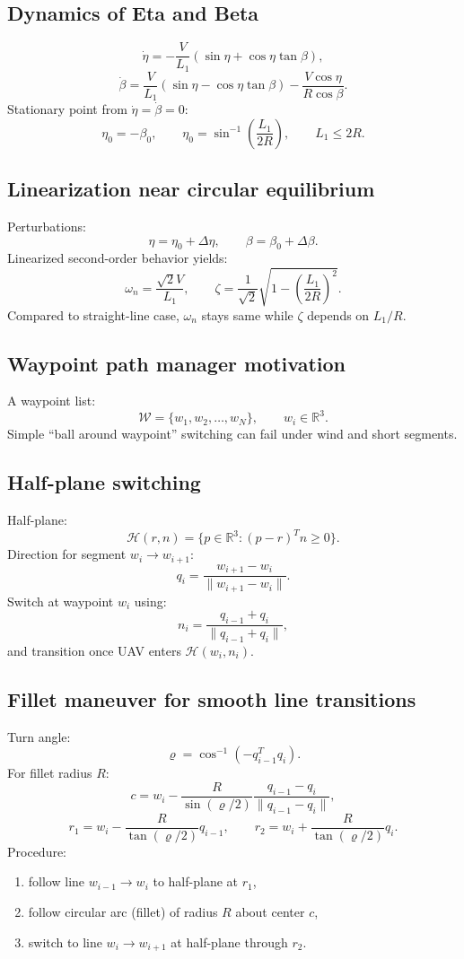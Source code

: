 \documentclass[11pt,a4paper]{article}
\newcommand{\R}{\mathbb{R}}
\begin{document}
\subsection{Dynamics of Eta and Beta}
\[
\dot\eta=-\frac{V}{L_1}\left(\sin\eta+\cos\eta\tan\beta\right),
\]
\[
\dot\beta=\frac{V}{L_1}\left(\sin\eta-\cos\eta\tan\beta\right)-\frac{V\cos\eta}{R\cos\beta}.
\]
Stationary point from $\dot\eta=\dot\beta=0$:
\[
\eta_0=-\beta_0,\qquad
\eta_0=\sin^{-1}\!\left(\frac{L_1}{2R}\right),\qquad
L_1\le 2R.
\]

\subsection{Linearization near circular equilibrium}
Perturbations:
\[
\eta=\eta_0+\Delta\eta,\qquad \beta=\beta_0+\Delta\beta.
\]
Linearized second-order behavior yields:
\[
\omega_n=\frac{\sqrt{2}V}{L_1},
\qquad
\zeta=\frac{1}{\sqrt{2}}\sqrt{1-\left(\frac{L_1}{2R}\right)^2}.
\]
Compared to straight-line case, $\omega_n$ stays same while $\zeta$ depends on $L_1/R$.

\subsection{Waypoint path manager motivation}
A waypoint list:
\[
\mathcal{W}=\{w_1,w_2,\dots,w_N\},\qquad w_i\in\R^3.
\]
Simple ``ball around waypoint'' switching can fail under wind and short segments.

\subsection{Half-plane switching}
Half-plane:
\[
\mathcal{H}(r,n)=\{p\in\R^3:(p-r)^T n\ge 0\}.
\]
Direction for segment $w_i\to w_{i+1}$:
\[
q_i=\frac{w_{i+1}-w_i}{\|w_{i+1}-w_i\|}.
\]
Switch at waypoint $w_i$ using:
\[
n_i=\frac{q_{i-1}+q_i}{\|q_{i-1}+q_i\|},
\]
and transition once UAV enters $\mathcal{H}(w_i,n_i)$.

\subsection{Fillet maneuver for smooth line transitions}
Turn angle:
\[
\varrho=\cos^{-1}(-q_{i-1}^Tq_i).
\]
For fillet radius $R$:
\[
c=w_i-\frac{R}{\sin(\varrho/2)}\frac{q_{i-1}-q_i}{\|q_{i-1}-q_i\|},
\]
\[
r_1=w_i-\frac{R}{\tan(\varrho/2)}q_{i-1},\qquad
r_2=w_i+\frac{R}{\tan(\varrho/2)}q_i.
\]
Procedure:
\begin{enumerate}
  \item follow line $w_{i-1}\to w_i$ to half-plane at $r_1$,
  \item follow circular arc (fillet) of radius $R$ about center $c$,
  \item switch to line $w_i\to w_{i+1}$ at half-plane through $r_2$.
\end{enumerate}
\end{document}
